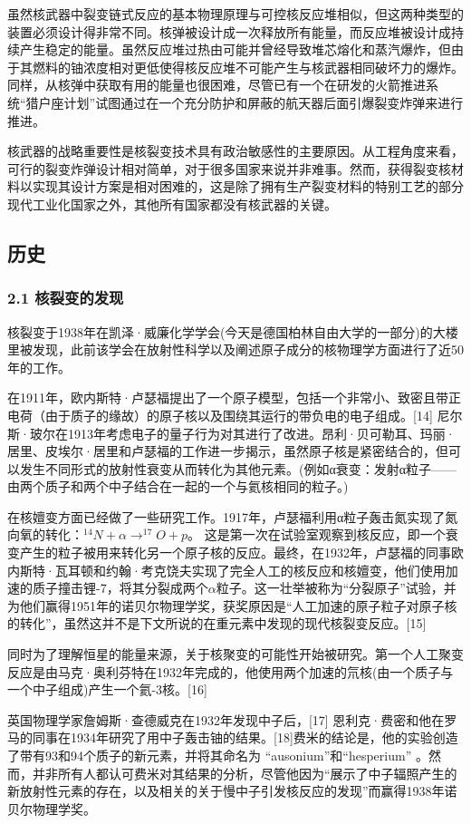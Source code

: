 虽然核武器中裂变链式反应的基本物理原理与可控核反应堆相似，但这两种类型的装置必须设计得非常不同。核弹被设计成一次释放所有能量，而反应堆被设计成持续产生稳定的能量。虽然反应堆过热由可能并曾经导致堆芯熔化和蒸汽爆炸，但由于其燃料的铀浓度相对更低使得核反应堆不可能产生与核武器相同破坏力的爆炸。同样，从核弹中获取有用的能量也很困难，尽管已有一个在研发的火箭推进系统“猎户座计划”试图通过在一个充分防护和屏蔽的航天器后面引爆裂变炸弹来进行推进。

核武器的战略重要性是核裂变技术具有政治敏感性的主要原因。从工程角度来看，可行的裂变炸弹设计相对简单，对于很多国家来说并非难事。然而，获得裂变核材料以实现其设计方案是相对困难的，这是除了拥有生产裂变材料的特别工艺的部分现代工业化国家之外，其他所有国家都没有核武器的关键。

\subsection{历史}
\subsubsection{2.1 核裂变的发现}
核裂变于1938年在凯泽·威廉化学学会(今天是德国柏林自由大学的一部分)的大楼里被发现，此前该学会在放射性科学以及阐述原子成分的核物理学方面进行了近50年的工作。

在1911年，欧内斯特·卢瑟福提出了一个原子模型，包括一个非常小、致密且带正电荷（由于质子的缘故）的原子核以及围绕其运行的带负电的电子组成。[14] 尼尔斯·玻尔在1913年考虑电子的量子行为对其进行了改进。昂利·贝可勒耳、玛丽·居里、皮埃尔·居里和卢瑟福的工作进一步揭示，虽然原子核是紧密结合的，但可以发生不同形式的放射性衰变从而转化为其他元素。(例如α衰变：发射α粒子——由两个质子和两个中子结合在一起的一个与氦核相同的粒子。)

在核嬗变方面已经做了一些研究工作。1917年，卢瑟福利用α粒子轰击氮实现了氮向氧的转化：$^{14}N + \alpha \to ^{17}O + p$。 这是第一次在试验室观察到核反应，即一个衰变产生的粒子被用来转化另一个原子核的反应。最终，在1932年，卢瑟福的同事欧内斯特·瓦耳顿和约翰·考克饶夫实现了完全人工的核反应和核嬗变，他们使用加速的质子撞击锂-7，将其分裂成两个$\alpha$粒子。这一壮举被称为“分裂原子”试验，并为他们赢得1951年的诺贝尔物理学奖，获奖原因是“人工加速的原子粒子对原子核的转化”，虽然这并不是下文所说的在重元素中发现的现代核裂变反应。[15]

同时为了理解恒星的能量来源，关于核聚变的可能性开始被研究。第一个人工聚变反应是由马克·奥利芬特在1932年完成的，他使用两个加速的氘核(由一个质子与一个中子组成)产生一个氦-3核。[16]

英国物理学家詹姆斯·查德威克在1932年发现中子后，[17] 恩利克·费密和他在罗马的同事在1934年研究了用中子轰击铀的结果。[18]费米的结论是，他的实验创造了带有93和94个质子的新元素，并将其命名为 “ausonium”和“hesperium” 。然而，并非所有人都认可费米对其结果的分析，尽管他因为“展示了中子辐照产生的新放射性元素的存在，以及相关的关于慢中子引发核反应的发现”而赢得1938年诺贝尔物理学奖。

